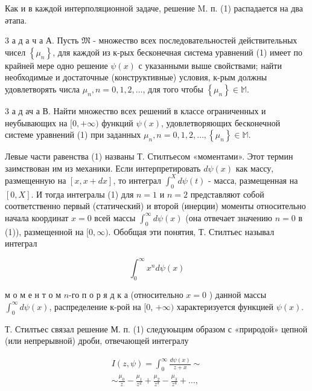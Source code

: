 \documentclass[10pt]{article}
\begin{document}
Как и в каждой интерполяционной задаче, решение M. п. (1) распадается на два әтапа.



3 а д а ч а А. Пусть $\mathfrak{M}$ - множество всех последовательностей действительных чисел $\left\{\mu_{n}\right\}$, для каждой из к-рых бесконечная система уравнений (1) имеет по крайней мере одно решение $\psi(x)$ с указанными выше свойствами; найти необходимые и достаточные (конструктивные) условия, к-рым должны удовлетворять числа $\mu_{n}, n=0,1,2, \ldots$, для того чтобы $\left\{\mu_{n}\right\} \in \mathbb{M}$.



3 а д ач а В. Найти множество всех решений в классе ограниченных и неубывающих на $[0,+\infty)$ функций $\psi(x)$, удовлетворяющих бесконечной системе уравнений (1) при заданных $\mu_{n}, n=0,1,2, \ldots,\left\{\mu_{n}\right\} \in \mathbb{M}$.



Левые части равенства (1) названы Т. Стилтьесом «моментами». Этот термин заимствован им из механики. Если интерпретировать $d \psi(x)$ как массу, размещенную на $[x, x+d x]$, то интеграл $\int_{0}^{X} d \psi(t)$ - масса, размещенная на $[0, X]$. И тогда интегралы (1) для $n=1$ и $n=2$ представляют собой соответственно первый (статический) и второй (инерции) моменты относительно начала координат $x=0$ всей массы $\int_{0}^{\infty} d \psi(x)$ (она отвечает значению $n=0$ в (1)), размещенной на $[0, \infty)$. Обобщая эти понятия, Т. Стилтьес называл интеграл



\[

\int_{0}^{\infty} x^{n} d \psi(x)

\]



м о м е н т о м $n$-го п о р я д к а (относительно $x=0$ ) данной массы $\int_{0}^{\infty} d \psi(x)$, распределение к-рой на $[0$, $+\infty)$ характеризуется функцией $\psi(x)$.



Т. Стилтьес связал решение М. п. (1) следуюыцим образом с «природой» цепной (или непрерывной) дроби, отвечающей интегралу



\[

\begin{gathered}

I(z, \psi)=\int_{0}^{\infty} \frac{d \psi(x)}{z+x} \sim \\

\sim \frac{\mu_{0}}{z}-\frac{\mu_{1}}{z^{2}}+\frac{\mu_{2}}{z^{3}}-\frac{\mu_{3}}{z^{4}}+\ldots,

\end{gathered}

\]
\end{document}
